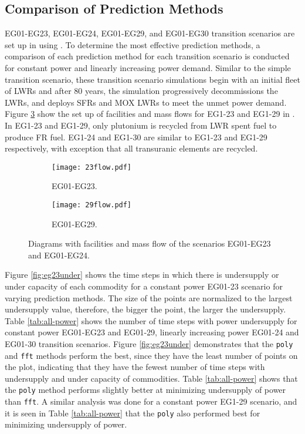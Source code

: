 \subsection{Comparison of Prediction Methods}

EG01-EG23, EG01-EG24, EG01-EG29, and EG01-EG30 transition scenarios
are set up in \Cyclus using \deploy. 
To determine the most effective \deploy prediction methods, a
comparison of each prediction method for each 
transition scenario is conducted for constant power 
and linearly increasing power demand. 
Similar to the simple transition scenario, these transition scenario 
simulations begin with an initial fleet of \glspl{LWR} and after 
80 years, the simulation progressively decommissions the \glspl{LWR}, 
and \deploy deploys \glspl{SFR} and \gls{MOX} \glspl{LWR} to meet 
the unmet power demand. 
Figure \ref{fig:eg2329}
show the set up of facilities and mass flows for 
EG1-23 and EG1-29 in \Cyclus. 
In EG1-23 and EG1-29, only plutonium is recycled from \gls{LWR}
spent fuel to produce \gls{FR} fuel. 
EG1-24 and EG1-30 are similar to EG1-23 and EG1-29 respectively,
with exception that all transuranic elements are recycled.  

\begin{figure}[]
	\centering
	\begin{subfigure}[t]{\textwidth}
		\centering
		\texttt{[image: 23flow.pdf]} 
		\caption{EG01-EG23.}
		\label{fig:23flow}
	\end{subfigure}
	\vspace{1cm}
	\begin{subfigure}[t]{\textwidth}
		\centering
		\texttt{[image: 29flow.pdf]} 
		\caption{EG01-EG29.}
		\label{fig:29flow}
	\end{subfigure}
	\hfill
	\caption{Diagrams with facilities and mass flow of the scenarios EG01-EG23 and EG01-EG24.}
	\label{fig:eg2329}
\end{figure}

Figure \ref{fig:eg23under} shows the time steps in which there is undersupply 
or under capacity of each commodity for a constant power EG01-23 scenario for 
varying prediction methods.
The size of the points are normalized to the largest undersupply
value, therefore, the bigger the point, the larger the undersupply. 
Table \ref{tab:all-power} shows the number of time steps with power 
undersupply for constant power EG01-EG23 and EG01-29, 
linearly increasing power EG01-24 and EG01-30 transition scenarios. 
Figure \ref{fig:eg23under} demonstrates that the \texttt{poly} and 
\texttt{fft} methods perform the best, since they have the least number 
of points on the plot, indicating that they have the fewest number of time 
steps with undersupply and under capacity of commodities. 
Table \ref{tab:all-power} shows that the \texttt{poly} method performs slightly 
better at minimizing undersupply of power than \texttt{fft}.
A similar analysis was done for a constant power EG1-29 scenario, and 
it is seen in Table \ref{tab:all-power} that the \texttt{poly} also performed 
best for minimizing undersupply of power.  

